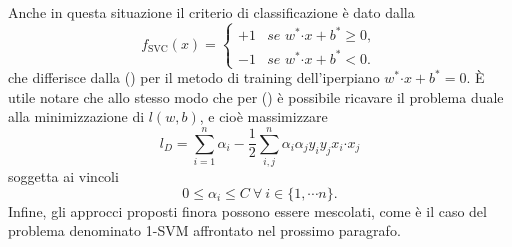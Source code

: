 \documentclass [11pt,a4paper,twoside,openright] {book}
\begin{document}
\noindent
Anche in questa situazione il criterio di classificazione è dato dalla
\begin{equation}
f_\mathrm{SVC}(x)=
\begin{cases}
+1 & \textit{se } w^* \boldsymbol{\cdot} x + b^* \geq 0, \\
-1 & \textit{se } w^* \boldsymbol{\cdot} x  + b^*< 0.
\end{cases}
\end{equation}
che differisce dalla () per il metodo di training dell'iperpiano $w^* \boldsymbol{\cdot} x + b^* = 0$.
È utile notare che allo stesso modo che per () è possibile ricavare il problema duale alla minimizzazione di $l(w,b)$, e cioè massimizzare
\begin{equation}\label{lossduale}
l_D = \sum_{i=1}^n \alpha_i -\dfrac{1}{2} \sum_{i,j}^n \alpha_i \alpha_j y_i y_j x_i \boldsymbol{\cdot} x_j
\end{equation}
soggetta ai vincoli
\begin{equation}
0 \leq \alpha_i \leq C \: \forall \: i \in \lbrace 1, \cdots n \rbrace.
\end{equation}
Infine, gli approcci proposti finora possono essere mescolati, come è il caso del problema denominato 1-SVM affrontato nel prossimo paragrafo.
\end{document}
